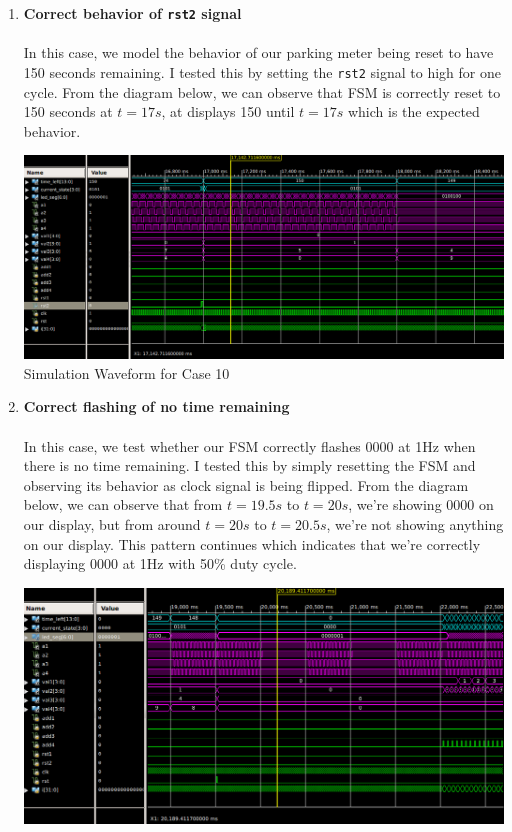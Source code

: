 \documentclass{article}
\begin{document}
\begin{enumerate}
    \item \textbf{Correct behavior of \texttt{rst2} signal} \\ \\
    In this case, we model the behavior of our parking meter being reset to have 150 seconds remaining. I tested this by setting the \texttt{rst2} signal to high for one cycle. From the diagram below, we can observe that FSM is correctly reset to 150 seconds at $t=17s$, at displays 150 until $t=17s$ which is the expected behavior.
    \begin{center}
        \includegraphics[scale=0.35]{waveform-10.png} \\
        \caption{Simulation Waveform for Case 10}
    \end{center}
    \item \textbf{Correct flashing of no time remaining} \\ \\
    In this case, we test whether our FSM correctly flashes 0000 at 1Hz when there is no time remaining. I tested this by simply resetting the FSM and observing its behavior as clock signal is being flipped. From the diagram below, we can observe that from $t=19.5s$ to $t=20s$, we're showing 0000 on our display, but from around $t=20s$ to $t=20.5s$, we're not showing anything on our display. This pattern continues which indicates that we're correctly displaying 0000 at 1Hz with 50\% duty cycle.
    \begin{center}
        \includegraphics[scale=0.4]{waveform-11.png} \\

\end{center}
\end{enumerate}
\end{document}
